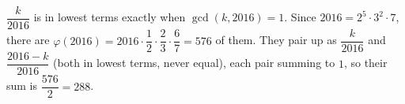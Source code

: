 $\dfrac {k}{2016}$ is in lowest terms exactly when $\gcd(k,2016)=1$. Since $2016=2^5\cdot3^2\cdot7$, there are $\varphi(2016)=2016\cdot\dfrac{1}{2}\cdot\dfrac{2}{3}\cdot\dfrac{6}{7}=\boxed{576}$ of them. They pair up as $\dfrac {k}{2016}$ and $\dfrac{2016-k}{2016}$ (both in lowest terms, never equal), each pair summing to $1$, so their sum is $\dfrac{576}{2}=\boxed{288}$.
